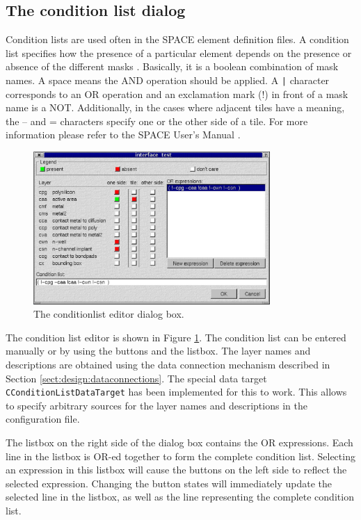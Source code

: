 \subsection{The condition list dialog} \label{sect:uidesign:conditionlist}
Condition lists are used often in the SPACE element definition files. A
condition list specifies how the presence of a particular element depends on
the presence or absence of the different masks \cite{SpaceMan}. Basically, it
is a boolean combination of mask names. A space means the AND operation should
be applied. A \verb=|= character corresponds to an OR operation and an
exclamation mark (!) in front of a mask name is a NOT. Additionally, in the
cases where adjacent tiles have a meaning, the -- and = characters specify one
or the other side of a tile. For more information please refer to the SPACE
User's Manual \cite{SpaceMan}.

\begin{figure} \begin{center}
\includegraphics[width=9cm]{./figures/conditionlist.eps}
\caption{The conditionlist editor dialog box.}
\label{fig:uidesign:conditionlist}
\end{center} \end{figure}

\bigskip \noindent
The condition list editor is shown in Figure \ref{fig:uidesign:conditionlist}.
The condition list can be entered manually or by using the buttons and the
listbox. The layer names and descriptions are obtained using the data
connection mechanism described in Section \ref{sect:design:dataconnections}.
The special data target \verb=CConditionListDataTarget= has been implemented
for this to work. This allows to specify arbitrary sources for the layer names
and descriptions in the configuration file.

The listbox on the right side of the dialog box contains the OR expressions.
Each line in the listbox is OR-ed together to form the complete condition list.
Selecting an expression in this listbox will cause the buttons on the left side
to reflect the selected expression. Changing the button states will immediately
update the selected line in the listbox, as well as the line representing the
complete condition list.

